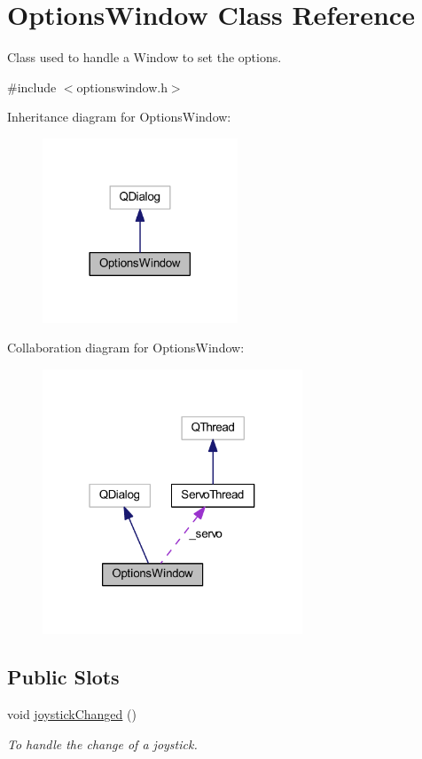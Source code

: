 \hypertarget{a00005}{}\section{Options\+Window Class Reference}
\label{a00005}


Class used to handle a Window to set the options.  




{\ttfamily \#include $<$optionswindow.\+h$>$}



Inheritance diagram for Options\+Window\+:\nopagebreak
\begin{figure}[H]
\begin{center}
\leavevmode
\includegraphics[width=165pt]{d0/dc0/a00033}
\end{center}
\end{figure}


Collaboration diagram for Options\+Window\+:\nopagebreak
\begin{figure}[H]
\begin{center}
\leavevmode
\includegraphics[width=220pt]{db/df3/a00034}
\end{center}
\end{figure}
\subsection*{Public Slots}
\begin{DoxyCompactItemize}
\item 
void \hyperlink{a00005_ae8c0373be58da710194f8d14f1c3c4dc}{joystick\+Changed} ()
\begin{DoxyCompactList}\small\item\em To handle the change of a joystick. \end{DoxyCompactList}\end{DoxyCompactItemize}
